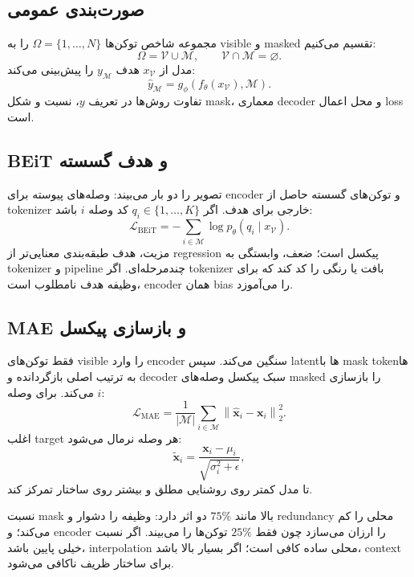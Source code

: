 \documentclass[12pt,openany,oneside]{book}
\newcommand{\norm}[1]{\left\lVert #1\right\rVert}
\newcommand{\abs}[1]{\left\lvert #1\right\rvert}
\newcommand{\vect}[1]{\bm{#1}}
\begin{document}
\subsection{صورت‌بندی عمومی}
مجموعه شاخص توکن‌ها $\Omega=\{1,\ldots,N\}$ را به visible و masked تقسیم می‌کنیم:
\begin{equation}
\Omega=\mathcal V\cup\mathcal M,
\qquad
\mathcal V\cap\mathcal M=\varnothing.
\end{equation}
مدل از $x_{\mathcal V}$ هدف $y_{\mathcal M}$ را پیش‌بینی می‌کند:
\begin{equation}
\widehat y_{\mathcal M}=g_\phi(f_\theta(x_{\mathcal V}),\mathcal M).
\end{equation}
تفاوت روش‌ها در تعریف $y$، نسبت و شکل mask، معماری decoder و محل اعمال loss است.

\subsection{BEiT و هدف گسسته}
 تصویر را دو بار می‌بیند: وصله‌های پیوسته برای encoder و توکن‌های گسسته حاصل از tokenizer خارجی برای هدف. اگر $q_i\in\{1,\ldots,K\}$ کد وصله $i$ باشد:
\begin{equation}
\mathcal L_{\mathrm{BEiT}}
=-\sum_{i\in\mathcal M}\log p_\theta(q_i\mid x_{\mathcal V}).
\end{equation}
مزیت، هدف طبقه‌بندی معنایی‌تر از regression پیکسل است؛ ضعف، وابستگی به tokenizer و pipeline چندمرحله‌ای. اگر tokenizer بافت یا رنگی را کد کند که برای وظیفه هدف نامطلوب است، encoder همان bias را می‌آموزد.

\subsection{MAE و بازسازی پیکسل}
 فقط توکن‌های visible را وارد encoder سنگین می‌کند. سپس latentها با mask tokenها به ترتیب اصلی بازگردانده و decoder سبک پیکسل وصله‌های masked را بازسازی می‌کند. برای وصله $i$:
\begin{equation}
\mathcal L_{\mathrm{MAE}}
=\frac{1}{\abs{\mathcal M}}\sum_{i\in\mathcal M}
\norm{\widehat{\vect x}_i-\vect x_i}_2^2.
\label{eq:mae}
\end{equation}
اغلب target هر وصله نرمال می‌شود:
\begin{equation}
\widetilde{\vect x}_i=\frac{\vect x_i-\mu_i}{\sqrt{\sigma_i^2+\epsilon}},
\end{equation}
تا مدل کمتر روی روشنایی مطلق و بیشتر روی ساختار تمرکز کند.

نسبت mask بالا مانند $75\%$ دو اثر دارد: وظیفه را دشوار و redundancy محلی را کم می‌کند؛ و encoder را ارزان می‌سازد چون فقط $25\%$ توکن‌ها را می‌بیند. اگر نسبت خیلی پایین باشد، interpolation محلی ساده کافی است؛ اگر بسیار بالا باشد، context برای ساختار ظریف ناکافی می‌شود.
\end{document}
